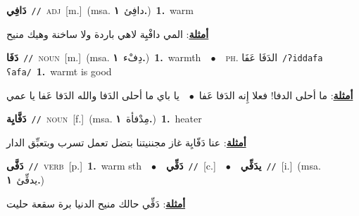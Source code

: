 \documentclass[10pt,a4paper,twoside]{article} %
\begin{document}
\begin{multicols}{2}
{\setlength\topsep{0pt}\textbf{\foreignlanguage{arabic}{دَافِي}}\ {\color{gray}\texttt{//}\color{black}}\ \textsc{adj}\ [m.]\ \color{gray}(msa. \foreignlanguage{arabic}{دافِئ}~\foreignlanguage{arabic}{\textbf{١.}})\color{black}\ \textbf{1.}~warm\  \begin{flushright}\color{gray}\foreignlanguage{arabic}{\textbf{\underline{\foreignlanguage{arabic}{أمثلة}}}: المي دافْيِة لاهي باردة ولا ساخنة وهيك منيح}\end{flushright}\color{black}} \vspace{2mm}

{\setlength\topsep{0pt}\textbf{\foreignlanguage{arabic}{دَفَا}}\ {\color{gray}\texttt{//}\color{black}}\ \textsc{noun}\ [m.]\ \color{gray}(msa. \foreignlanguage{arabic}{دِفْء}~\foreignlanguage{arabic}{\textbf{١.}})\color{black}\ \textbf{1.}~warmth\ \ $\bullet$\ \ \textsc{ph.} \color{gray} \foreignlanguage{arabic}{الدَفَا عَفَا}\color{black}\ {\color{gray}\texttt{/{\sffamily ʔiddafa ʕafa}/}\color{black}}\ \textbf{1.}~warmt is good\  \begin{flushright}\color{gray}\foreignlanguage{arabic}{\textbf{\underline{\foreignlanguage{arabic}{أمثلة}}}: ما أحلى الدفا! فعلا إِنه الدَفا عَفا\ $\bullet$\ \  يا باي ما أحلى الدَفا والله الدَفا عَفا يا عمي}\end{flushright}\color{black}} \vspace{2mm}

{\setlength\topsep{0pt}\textbf{\foreignlanguage{arabic}{دَفَّايِة}}\ {\color{gray}\texttt{//}\color{black}}\ \textsc{noun}\ [f.]\ \color{gray}(msa. \foreignlanguage{arabic}{مِدْفأة}~\foreignlanguage{arabic}{\textbf{١.}})\color{black}\ \textbf{1.}~heater\  \begin{flushright}\color{gray}\foreignlanguage{arabic}{\textbf{\underline{\foreignlanguage{arabic}{أمثلة}}}: عنا دَفّايِة غاز مجننيتنا بتضل تعمل تسرب وبتعبِّق الدار}\end{flushright}\color{black}} \vspace{2mm}

{\setlength\topsep{0pt}\textbf{\foreignlanguage{arabic}{دَفَّى}}\ {\color{gray}\texttt{//}\color{black}}\ \textsc{verb}\ [p.]\ \textbf{1.}~warm sth\ \ $\bullet$\ \ \setlength\topsep{0pt}\textbf{\foreignlanguage{arabic}{دَفِّي}}\ {\color{gray}\texttt{//}\color{black}}\ [c.]\ \ $\bullet$\ \ \setlength\topsep{0pt}\textbf{\foreignlanguage{arabic}{يدَفِّي}}\ {\color{gray}\texttt{//}\color{black}}\ [i.]\ \color{gray}(msa. \foreignlanguage{arabic}{يدفِّئ}~\foreignlanguage{arabic}{\textbf{١.}})\color{black}\  \begin{flushright}\color{gray}\foreignlanguage{arabic}{\textbf{\underline{\foreignlanguage{arabic}{أمثلة}}}: دَفِّي حالك منيح الدنيا برة سقعة حليت}\end{flushright}\color{black}} \vspace{2mm}


\end{multicols}
\end{document}
